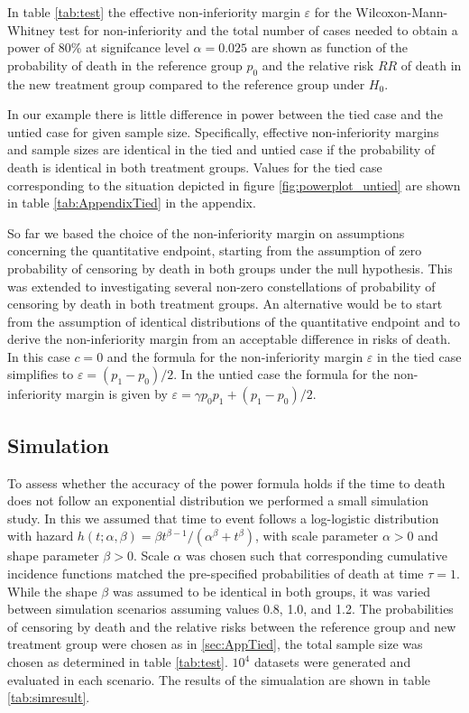 \documentclass[bimj,fleqn]{w-art}\usepackage[]{graphicx}\usepackage[]{color}
\theoremstyle{plain}
\theoremstyle{definition}
\begin{document}
In table \ref{tab:test} the effective non-inferiority margin $\varepsilon$ for the
Wilcoxon-Mann-Whitney test for non-inferiority and the total number of cases
needed to obtain a power of 80\% at signifcance level $\alpha =0.025$ are
shown as function of the probability of death in the reference group $p_0$ and
the relative risk $RR$ of death in the new treatment group compared to the
reference group under $H_0$.

In our example there is little difference in power between the tied case
and the untied case for given sample size. Specifically, effective
non-inferiority margins and sample sizes are identical in the tied and untied
case if the probability of death is identical in both treatment groups. Values
for the tied case corresponding to the situation depicted in figure
\ref{fig:powerplot_untied} are shown in table \ref{tab:AppendixTied} in the
appendix.

So far we based the choice of the non-inferiority margin on assumptions
concerning the quantitative endpoint, starting from the assumption of zero
probability of censoring by death in both groups under the null hypothesis.
This was extended to investigating several non-zero constellations of probability
of censoring by death in both treatment groups. An alternative would be to start
from the assumption of identical distributions of the quantitative endpoint and
to derive the non-inferiority margin from an acceptable difference in risks of
death. In this case $c = 0$ and the formula for the non-inferiority margin
$\varepsilon$ in the tied case simplifies to $\varepsilon = (p_1 - p_0) / 2$.
In the untied case the formula for the non-inferiority margin is given by
$\varepsilon = \gamma p_0 p_1 + (p_1 - p_0) / 2$.


\subsection{Simulation}
\label{sec:Sim}



To assess whether the accuracy of the power formula holds if the time to
death does not follow an exponential distribution we performed a small simulation
study. In this we assumed that time to event follows a log-logistic distribution
with hazard $h(t; \alpha, \beta) = \beta t^{\beta - 1} / (\alpha^{\beta} + t^{\beta})$,
with scale parameter $\alpha > 0 $ and shape parameter $\beta > 0$. Scale $\alpha$ was
chosen such that corresponding cumulative incidence functions matched the
pre-specified probabilities of death at time $\tau = 1$. While the shape $\beta$
was assumed to be identical in both groups, it was varied between simulation
scenarios assuming values 0.8, 1.0, and 1.2.
The probabilities of censoring by death and the relative risks between the
reference group and new treatment group were chosen as in \ref{sec:AppTied}, the
total sample size was chosen as determined in table \ref{tab:test}. \ensuremath{10^{4}} datasets
were generated and evaluated in each scenario. The results of the simualation
are shown in table \ref{tab:simresult}.
\end{document}
